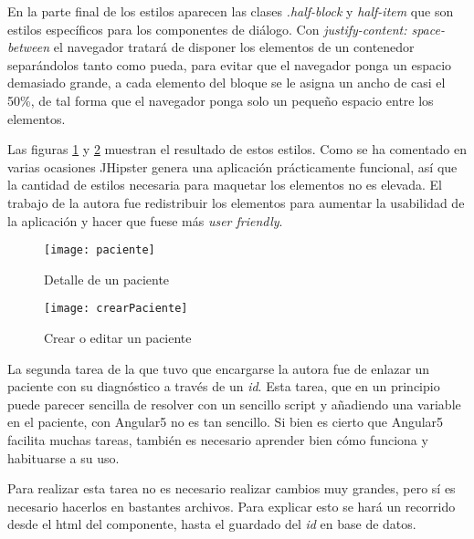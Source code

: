 

En la parte final de los estilos aparecen las clases \emph{.half-block} y \emph{half-item} que son estilos específicos para los componentes de diálogo. Con \emph{justify-content: space-between} el navegador tratará de disponer los elementos de un contenedor separándolos tanto como pueda, para evitar que el navegador ponga un espacio demasiado grande, a cada elemento del bloque se le asigna un ancho de casi el 50\%, de tal forma que el navegador ponga solo un pequeño espacio entre los elementos. 

Las figuras \ref{fig:pacienteDetail} y \ref{fig:crearPaciente} muestran el resultado de estos estilos. Como se ha comentado en varias ocasiones JHipster genera una aplicación prácticamente funcional, así que la cantidad de estilos necesaria para maquetar los elementos no es elevada. El trabajo de la autora fue redistribuir los elementos para aumentar la usabilidad de la aplicación y hacer que fuese más \emph{user friendly}.

\begin{figure}[!h]
\begin{center}
\texttt{[image: paciente]}
\caption{Detalle de un paciente}
\label{fig:pacienteDetail}
\end{center}
\end{figure}

\begin{figure}[!h]
\begin{center}
\texttt{[image: crearPaciente]}
\caption{Crear o editar un paciente}
\label{fig:crearPaciente}
\end{center}
\end{figure}

La segunda tarea de la que tuvo que encargarse la autora fue de enlazar un paciente con su diagnóstico a través de un \emph{id}. Esta tarea, que en un principio puede parecer sencilla de resolver con un sencillo script y añadiendo una variable en el paciente, con Angular5 no es tan sencillo. Si bien es cierto que Angular5 facilita muchas tareas, también es necesario aprender bien cómo funciona y habituarse a su uso.

Para realizar esta tarea no es necesario realizar cambios muy grandes, pero sí es necesario hacerlos en bastantes archivos. Para explicar esto se hará un recorrido desde el html del componente, hasta el guardado del \emph{id} en base de datos.

